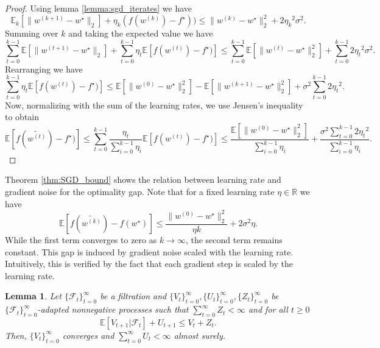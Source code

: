 \documentclass[12pt]{article}
\newtheorem{lemma}[theorem]{Lemma}
\theoremstyle{definition}
\numberwithin{equation}{section}
\newcommand{\R}{\mathbb{R}}
\newcommand{\E}{\mathbb{E}}
\newcommand{\CF}{\mathcal{F}}
\newcommand{\ev}[1]{\mathbb{E}\left[{#1}\right]}
\newcommand{\norm}[1]{\lVert{#1}\rVert_2}
\begin{document}
\begin{proof}
  Using lemma \ref{lemma:sgd_iterates} we have
  \begin{equation*}
    \E_k[\norm{w^{(k+1)} - w^\star}] + \eta_k (f(w^{(k)}) - f^\star)) \leq \norm{w^{(k)} - w^\star}^2 + 2{\eta_k}^2\sigma^2.
  \end{equation*}
  Summing over $k$ and taking the expected value we have
  \begin{equation*}
    \sum_{t=0}^{k-1}\ev{\norm{w^{(t+1)} - w^\star}} + \sum_{t=0}^{k-1} \eta_t \ev{f(w^{(t)}) - f^\star)} \leq \sum_{t=0}^{k-1} \ev{\norm{w^{(t)} - w^\star}^2} + \sum_{t=0}^{k-1} 2{\eta_t}^2\sigma^2.
  \end{equation*}
  Rearranging we have
  \begin{equation*}
    \sum_{t=0}^{k-1} \eta_t \ev{f(w^{(t)}) - f^\star)} \leq \ev{\norm{w^{(0)} - w^\star}^2} - \ev{\norm{w^{(k+1)} - w^\star}^2} + \sigma^2\sum_{t=0}^{k-1} 2{\eta_t}^2.
  \end{equation*}
  Now, normalizing with the sum of the learning rates, we use Jensen's inequality to obtain
  \begin{equation*}
    \ev{f(\widetilde{w^{(t)}}) - f^\star)} \leq \sum_{t=0}^{k-1} \frac{\eta_t}{\sum_{i=0}^{k-1}\eta_i} \ev{f(w^{(t)}) - f^\star)} \leq \frac{\ev{\norm{w^{(0)} - w^\star}^2}}{\sum_{i=0}^{k-1}\eta_i} + \frac{\sigma^2\sum_{t=0}^{k-1} 2{\eta_t}^2}{\sum_{i=0}^{k-1}\eta_i}.
  \end{equation*}
\end{proof}
Theorem \ref{thm:SGD_bound} shows the relation between learning rate and gradient noise for the optimality gap. Note that for a fixed learning rate $\eta \in \R$ we have
\begin{equation*}
  \E [f(\widetilde{w^{(k)}}) - f(w^\star)] \leq \frac{\norm{w^{(0)} - w^\star}^2}{\eta k} + 2 \sigma^2 \eta.
\end{equation*}
While the first term converges to zero as $k \rightarrow \infty$, the second term remains constant. This gap is induced by gradient noise scaled with the learning rate. Intuitively, this is verified by the fact that each gradient step is scaled by the learning rate.
\begin{lemma}
  Let $\{\CF_t\}_{t=0}^\infty$ be a filtration and $\{V_t\}_{t=0}^\infty, \{U_t\}_{t=0}^\infty, \{Z_t\}_{t=0}^\infty$ be $\{\CF_t\}_{t=0}^\infty$-adapted nonnegative processes such that $\sum_{t=0}^\infty Z_t < \infty$ and for all $t \geq 0$
  \begin{equation*}
    \ev{V_{t+1}|\CF_t} + U_{t+1} \leq V_t + Z_t.
  \end{equation*}
  Then, $\{V_t\}_{t=0}^\infty$ converges and $\sum_{t=0}^\infty U_t < \infty$ almost surely.
\end{lemma}
\end{document}
